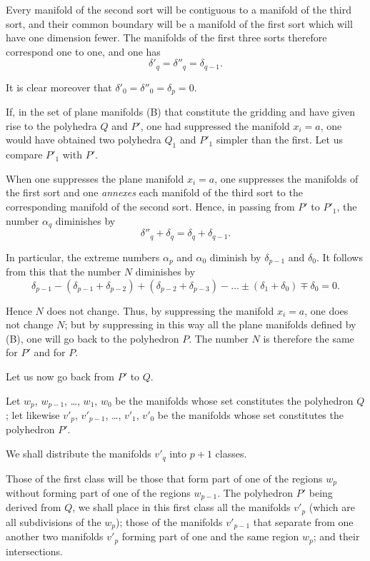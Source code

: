 \documentclass{article}
\begin{document}
Every manifold of the second sort will be contiguous to a manifold of the third sort, and their common boundary will be a manifold of the first sort which will have one dimension fewer. The manifolds of the first three sorts therefore correspond one to one, and one has
\[ \delta'_{q} = \delta''_{q} = \delta_{q-1}. \]

It is clear moreover that $\delta'_{0} = \delta''_{0} = \delta_{p} = 0$.

If, in the set of plane manifolds (B) that constitute the gridding and have given rise to the polyhedra $Q$ and $P'$, one had suppressed the manifold $x_{i} = a$, one would have obtained two polyhedra $Q_{1}$ and $P'_{1}$ simpler than the first. Let us compare $P'_{1}$ with $P'$.

When one suppresses the plane manifold $x_{i} = a$, one suppresses the manifolds of the first sort and one \emph{annexes} each manifold of the third sort to the corresponding manifold of the second sort. Hence, in passing from $P'$ to $P'_{1}$, the number $\alpha_{q}$ diminishes by
\[ \delta''_{q} + \delta_{q} = \delta_{q} + \delta_{q-1}. \]

In particular, the extreme numbers $\alpha_{p}$ and $\alpha_{0}$ diminish by $\delta_{p-1}$ and $\delta_{0}$. It follows from this that the number $N$ diminishes by
\[ \delta_{p-1} - (\delta_{p-1} + \delta_{p-2}) + (\delta_{p-2} + \delta_{p-3}) - \ldots \pm (\delta_{1} + \delta_{0}) \mp \delta_{0} = 0. \]

Hence $N$ does not change. Thus, by suppressing the manifold $x_{i} = a$, one does not change $N$; but by suppressing in this way all the plane manifolds defined by (B), one will go back to the polyhedron $P$. The number $N$ is therefore the same for $P'$ and for $P$.

Let us now go back from $P'$ to $Q$.

Let $w_{p}$, $w_{p-1}$, \ldots, $w_{1}$, $w_{0}$ be the manifolds whose set constitutes the polyhedron $Q$; let likewise $v'_{p}$, $v'_{p-1}$, \ldots, $v'_{1}$, $v'_{0}$ be the manifolds whose set constitutes the polyhedron $P'$.

We shall distribute the manifolds $v'_{q}$ into $p + 1$ classes.

Those of the first class will be those that form part of one of the regions $w_{p}$ without forming part of one of the regions $w_{p-1}$. The polyhedron $P'$ being derived from $Q$, we shall place in this first class all the manifolds $v'_{p}$ (which are all subdivisions of the $w_{p}$); those of the manifolds $v'_{p-1}$ that separate from one another two manifolds $v'_{p}$ forming part of one and the same region $w_{p}$; and their intersections.
\end{document}
